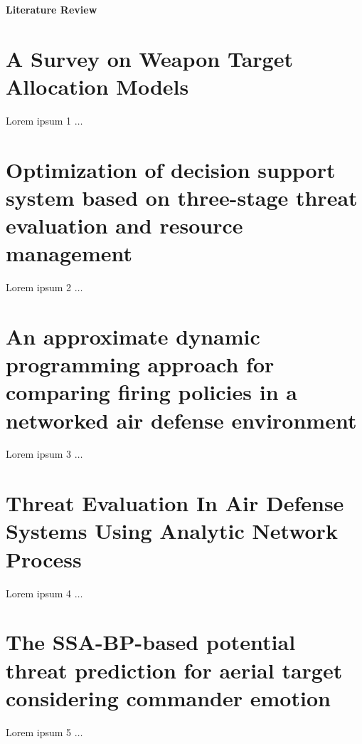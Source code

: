 \documentclass[12pt]{article} %
\begin{document}
 
\begin{center}
\textbf{Literature Review}
\end{center}
\bigskip

\section*{A Survey on Weapon Target Allocation Models \\ \cite{Ghanbari2021ASO}}
Lorem ipsum 1 $\ldots$


\section*{Optimization of decision support system based on three-stage threat evaluation and resource management \cite{Naseem2017OptimizationOD}}
Lorem ipsum 2 $\ldots$


\section*{An approximate dynamic programming approach for comparing firing policies in a networked air defense environment \cite{Summers2020AnAD}}
Lorem ipsum 3 $\ldots$


\section*{Threat Evaluation In Air Defense Systems Using Analytic Network Process \cite{Unver2019ThreatEI}}
Lorem ipsum 4 $\ldots$

\section*{The SSA-BP-based potential threat prediction for aerial target considering commander emotion \cite{WANG20222097}}
Lorem ipsum 5 $\ldots$

\newpage
\begin{center}


\end{center}
\end{document}

